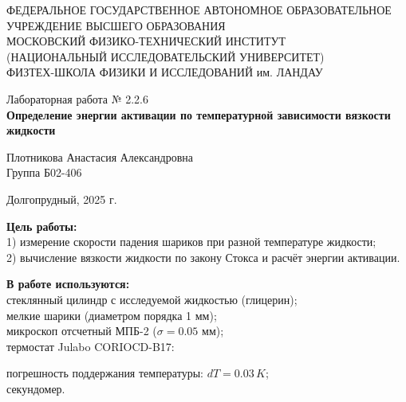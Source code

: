\documentclass[a4paper,12pt]{article} %
\begin{document}
\begin{center}
	\footnotesize{ФЕДЕРАЛЬНОЕ ГОСУДАРСТВЕННОЕ АВТОНОМНОЕ ОБРАЗОВАТЕЛЬНОЕ 			УЧРЕЖДЕНИЕ ВЫСШЕГО ОБРАЗОВАНИЯ}\\
	\footnotesize{МОСКОВСКИЙ ФИЗИКО-ТЕХНИЧЕСКИЙ ИНСТИТУТ\\(НАЦИОНАЛЬНЫЙ 			ИССЛЕДОВАТЕЛЬСКИЙ УНИВЕРСИТЕТ)}\\
	\footnotesize{ФИЗТЕХ-ШКОЛА ФИЗИКИ И ИССЛЕДОВАНИЙ им. ЛАНДАУ\\}
	\hfill \break
	\hfill \break
	\hfill \break
	\hfill \break
\end{center}

\begin{center}   
    \hfill \break
	\hfill \break
	\hfill \break
	\hfill \break    \hfill \break
	\hfill \break
	\hfill \break
	\hfill \break
    \hfill \break
    \hfill \break
	\hfill \break
	\large{Лабораторная работа № 2.2.6 \\\textbf{Определение энергии активации
	по температурной зависимости вязкости жидкости}}\\
	\begin{flushright}
		Плотникова Анастасия Александровна\\
		Группа Б02-406
	\end{flushright}
	\hfill \break
	\hfill \break
	\hfill \break
\end{center}
\hfill \break
\hfill \break
\hfill \break
\hfill \break
\hfill \break
\hfill \break
\hfill \break
\hfill \break
\hfill \break
\hfill \break
\hfill \break
\hfill \break
\hfill \break
\begin{center}
	Долгопрудный, 2025 г.
\end{center}
\thispagestyle{empty}
\newpage
	\textbf{Цель работы:}\\ 
	1) измерение скорости падения шариков при разной температуре жидкости; \\
	2) вычисление вязкости жидкости по закону Стокса и расчёт энергии активации. \\
	\hfill \break
	
	\textbf{В работе используются:}\\ 
	стеклянный цилиндр с исследуемой жидкостью (глицерин); \\
	мелкие шарики (диаметром порядка 1 мм); \\
	микроскоп отсчетный МПБ-2 ($\sigma = 0.05$ мм); \\
	термостат Julabo CORIOCD-B17: 	\par
	погрешность поддержания температуры: $dT = 0.03 \, K$; \\
	секундомер. \\
\end{document}
